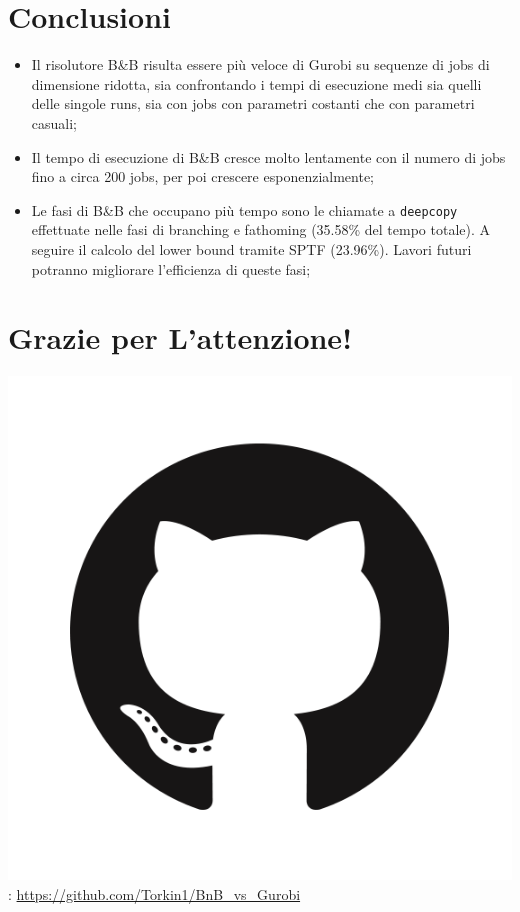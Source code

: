 \documentclass[compress]{beamer}
\begin{document}
\section{Conclusioni}
    \begin{frame}{\secname}
        \begin{itemize}
            \item Il risolutore B\&B risulta essere più veloce di Gurobi su sequenze
            di jobs di dimensione ridotta, sia confrontando i tempi di esecuzione medi sia quelli delle
            singole runs, sia con jobs con parametri costanti che con parametri casuali;
            \item Il tempo di esecuzione di B\&B cresce molto lentamente con il numero di jobs fino a
            circa 200 jobs, per poi crescere esponenzialmente;
            \item Le fasi di B\&B che occupano più tempo sono le chiamate a \texttt{deepcopy}
            effettuate nelle fasi di branching e fathoming (35.58\% del tempo totale). A seguire
            il calcolo del lower bound tramite SPTF (23.96\%). Lavori futuri potranno migliorare
            l'efficienza di queste fasi;

        \end{itemize}
    \end{frame}

\section{Grazie per L'attenzione!}

\begin{frame}{\secname}
    \includegraphics[scale=0.03]{figs/GitHub-Mark.png}: \url{https://github.com/Torkin1/BnB_vs_Gurobi}
\end{frame}
\end{document}
